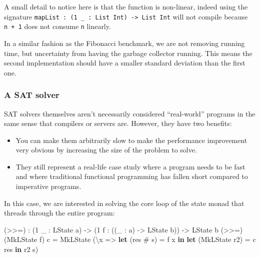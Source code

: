 \documentclass[
]{article}
\newenvironment{Shaded}{}{}
\newcommand{\DataTypeTok}[1]{\textcolor[rgb]{0.56,0.13,0.00}{#1}}
\newcommand{\DecValTok}[1]{\textcolor[rgb]{0.25,0.63,0.44}{#1}}
\newcommand{\KeywordTok}[1]{\textcolor[rgb]{0.00,0.44,0.13}{\textbf{#1}}}
\newcommand{\NormalTok}[1]{#1}
\newcommand{\OperatorTok}[1]{\textcolor[rgb]{0.40,0.40,0.40}{#1}}
\newcommand{\OtherTok}[1]{\textcolor[rgb]{0.00,0.44,0.13}{#1}}
\providecommand{\tightlist}{%
  \setlength{\itemsep}{0pt}\setlength{\parskip}{0pt}}
\begin{document}
A small detail to notice here is that the function is non-linear, indeed
using the signature
\texttt{mapList\ :\ (1\ \_\ :\ List\ Int)\ -\textgreater{}\ List\ Int}
will not compile because \texttt{n\ +\ 1} does not consume \texttt{n}
linearly.

In a similar fashion as the Fibonacci benchmark, we are not removing
running time, but uncertainty from having the garbage collector running.
This means the second implementation should have a smaller standard
deviation than the first one.

\hypertarget{a-sat-solver}{%
\subsubsection{A SAT solver}\label{a-sat-solver}}

SAT solvers themselves aren't necessarily considered ``real-world''
programs in the same sense that compilers or servers are. However, they
have two benefits:

\begin{itemize}
\tightlist
\item
  You can make them arbitrarily slow to make the performance improvement
  very obvious by increasing the size of the problem to solve.
\item
  They still represent a real-life case study where a program needs to
  be fast and where traditional functional programming has fallen short
  compared to imperative programs.
\end{itemize}

In this case, we are interested in solving the core loop of the state
monad that threads through the entire program:

\begin{Shaded}
\begin{Highlighting}[]
\NormalTok{(}\OperatorTok{\textgreater{}\textgreater{}=}\NormalTok{) }\OperatorTok{:}\NormalTok{ (}\DecValTok{1}\NormalTok{ \_ }\OperatorTok{:} \DataTypeTok{LState}\NormalTok{ a) }\OtherTok{{-}\textgreater{}}\NormalTok{ (}\DecValTok{1}\NormalTok{ f }\OperatorTok{:}\NormalTok{ ((\_ }\OperatorTok{:}\NormalTok{ a) }\OtherTok{{-}\textgreater{}} \DataTypeTok{LState}\NormalTok{ b))}
     \OtherTok{{-}\textgreater{}} \DataTypeTok{LState}\NormalTok{ b}
\NormalTok{(}\OperatorTok{\textgreater{}\textgreater{}=}\NormalTok{) (}\DataTypeTok{MkLState}\NormalTok{ f) c }\OtherTok{=} \DataTypeTok{MkLState} 
\NormalTok{    (\textbackslash{}x }\OtherTok{=\textgreater{}} \KeywordTok{let}\NormalTok{ (res }\OperatorTok{\#}\NormalTok{ s\textquotesingle{}) }\OtherTok{=}\NormalTok{ f x }\KeywordTok{in}
           \KeywordTok{let}\NormalTok{ (}\DataTypeTok{MkLState}\NormalTok{ r2) }\OtherTok{=}\NormalTok{ c res }\KeywordTok{in} 
\NormalTok{           r2 s\textquotesingle{})}
\end{Highlighting}
\end{Shaded}
\end{document}
